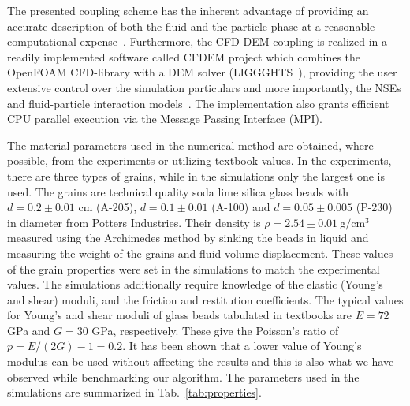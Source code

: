 \documentclass[twoside,twocolumn,9pt]{article}
\begin{document}
The presented coupling scheme has the inherent advantage of providing an accurate 
description of both the fluid and the particle phase at a reasonable 
computational expense~\cite{zhu2007discrete}.
Furthermore, the CFD-DEM coupling is realized in a readily implemented software called CFDEM project which combines
the OpenFOAM CFD-library with a DEM solver (LIGGGHTS~\cite{kloss2012models}), providing the user  extensive control over the simulation particulars and more importantly, the NSEs and fluid-particle interaction models~\cite{zhou2010discrete}. The implementation also grants efficient CPU parallel execution via the Message Passing Interface (MPI).

The material parameters used in the numerical method are obtained, where possible, from the experiments or utilizing textbook values.
In the experiments, there are three types of grains, while in the simulations only the largest one is used. The grains are technical quality soda lime silica glass beads with $d=0.2\pm0.01$ cm (A-205),  $d=0.1\pm0.01$ (A-100) and $d=0.05\pm0.005$ (P-230) in diameter from Potters Industries. Their density is $\rho=2.54 \pm 0.01~\mathrm{g/cm^3}$ measured using the Archimedes method by sinking the beads in liquid and measuring the weight of the grains and fluid volume displacement. 
These values of the grain properties were set in the simulations to match the experimental values.
The simulations additionally require knowledge of the elastic (Young's and shear) moduli, and the friction and restitution coefficients.
The typical values for Young's and shear moduli of glass beads tabulated in textbooks are $E=72$ GPa and $G=30$ GPa, respectively.
These give the Poisson's ratio of $p = E/(2G) - 1 = 0.2$. 
It has been shown that a lower value of Young's modulus can be used without affecting the results \cite{Lommen2014Par} and this is also what we have observed while benchmarking our algorithm.
The parameters used in the simulations are summarized in Tab.~\ref{tab:properties}. 
\end{document}
